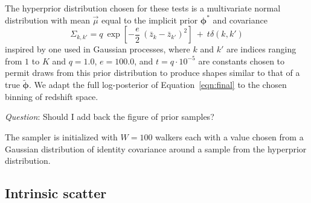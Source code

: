 \documentclass[iop]{emulateapj}
\newcommand{\todo}[3]{{\color{#2}\emph{#1}: #3}}
\newcommand{\aim}[1]{\todo{AIM}{red}{#1}}
\newcommand{\que}[1]{\todo{Question}{cyan}{#1}}
\newcommand{\Eq}[1]{Equation~\ref{#1}}
\newcommand{\Fig}[1]{Figure~\ref{#1}}
\newcommand{\pr}[1]{\ensuremath{\mathrm{p}(#1)}}%
\newcommand{\gvn}{\mid}%
\newcommand{\bvec}[1]{\ensuremath{\boldsymbol{#1}}}%
\newcommand{\ndphi}{\bvec{\phi}}
\begin{document}
The hyperprior distribution chosen for these tests is a multivariate normal distribution with mean $\vec{\mu}$ equal to the implicit prior $\ndphi^{*}$ and covariance
\begin{equation}
\label{eqn:priorcov}
\Sigma_{k,k'} = q\ \exp[-\frac{e}{2}\ (\bar{z}_{k}-\bar{z}_{k'})^{2}]\ +\ t\delta(k,k')
\end{equation}
inspired by one used in Gaussian processes, where $k$ and $k'$ are indices ranging from $1$ to $K$ and $q=1.0$, $e=100.0$, and $t=q\cdot10^{-5}$ are constants chosen to permit draws from this prior distribution to produce shapes similar to that of a true $\tilde{\ndphi}$.  
We adapt the full log-posterior of \Eq{eqn:final} to the chosen binning of redshift space.

%
\que{Should I add back the figure of prior samples?}

The sampler is initialized with $W=100$ walkers each with a value chosen from a Gaussian distribution of identity covariance around a sample from the hyperprior distribution.  

\subsection{Intrinsic scatter}
\label{sec:scatter}

\end{document}
